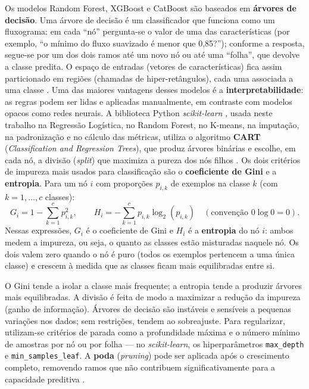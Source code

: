 \documentclass[msc]{on} %
\providecommand{\DIFaddtex}[1]{{\protect\color{red}#1}} %
\providecommand{\DIFaddbegin}{} %
\providecommand{\DIFaddend}{} %
\providecommand{\DIFadd}[1]{\texorpdfstring{\DIFaddtex{#1}}{#1}} %
\begin{document}
Os modelos Random Forest, XGBoost e CatBoost são baseados em \textbf{árvores de decisão}. Uma árvore de decisão é um classificador que funciona como um fluxograma: em cada ``nó'' pergunta-se o valor de uma das características (por exemplo, ``o mínimo do fluxo suavizado é menor que 0,85?''); conforme a resposta, segue-se por um dos dois ramos até um novo nó ou até uma ``folha'', que devolve a classe predita. O espaço de entradas (vetores de características) fica assim particionado em regiões (chamadas de hiper-retângulos), cada uma associada a uma classe \citep{Levada2026}. Uma das maiores vantagens desses modelos é a \textbf{interpretabilidade}: as regras podem ser lidas e aplicadas manualmente, em contraste com modelos opacos como redes neurais. A biblioteca Python \textit{scikit-learn} \citep{ScikitLearn2011}, usada neste trabalho na Regressão Logística, no Random Forest, no K-means, na imputação, na padronização e no cálculo das métricas, utiliza o algoritmo \textbf{CART} (\textit{Classification and Regression Trees}), que produz árvores binárias e escolhe, em cada nó, a divisão \DIFaddbegin \DIFadd{(}\textit{\DIFadd{split}}\DIFadd{) }\DIFaddend que maximiza a pureza dos nós filhos \citep{geron2019maos}. Os dois critérios de impureza mais usados para classificação são o \textbf{coeficiente de Gini} e a \textbf{entropia}. Para um nó \(i\) com proporções \(p_{i,k}\) de exemplos na classe \(k\) (com \(k=1,\ldots,c\) classes):
\begin{equation}
G_i = 1 - \sum_{k=1}^{c} p_{i,k}^2, \qquad
H_i = -\sum_{k=1}^{c} p_{i,k} \log_2(p_{i,k}) \quad (\text{convenção } 0\log 0 = 0).
\end{equation}
Nessas expressões, \(G_i\) é o coeficiente de Gini e \(H_i\) é a \textbf{entropia} do nó \(i\): ambos medem a impureza, ou seja, o quanto as classes estão misturadas naquele nó. Os dois valem zero quando o nó é puro (todos os exemplos pertencem a uma única classe) e crescem à medida que as classes ficam mais equilibradas entre si.

O Gini tende a isolar a classe mais frequente; a entropia tende a produzir árvores mais equilibradas. A divisão é feita de modo a maximizar a redução da impureza (ganho de informação). Árvores de decisão são instáveis e sensíveis a pequenas variações nos dados; sem restrições, tendem ao sobreajuste. Para regularizar, utilizam-se critérios de parada como a profundidade máxima e o número mínimo de amostras por nó ou por folha \citep{geron2019maos} --- no \textit{scikit-learn}, os hiperparâmetros \texttt{max\_depth} e \texttt{min\_samples\_leaf}. A \textbf{poda} (\textit{pruning}) pode ser aplicada após o crescimento completo, removendo ramos que não contribuem significativamente para a capacidade preditiva \citep{Levada2026}.
\end{document}
